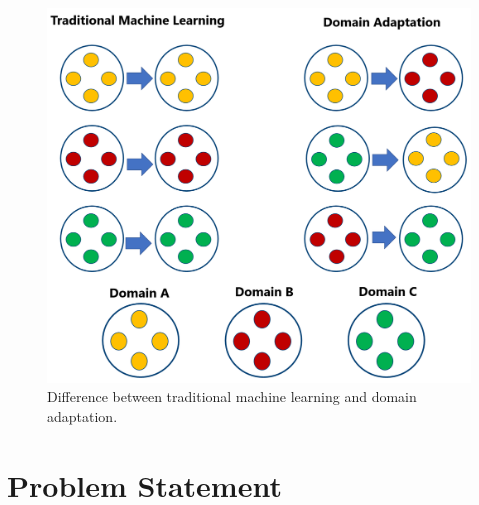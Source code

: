 \begin{figure}[H]
        \begin{center}
 	    \includegraphics[scale=0.30]{images/Introduction/DomainAdaptation.png}
	    \caption[Difference between traditional machine learning and domain adaptation.]{Difference between traditional machine learning and domain adaptation.}
	    \label{fig:DomainAdaptation}
	    \end{center}
\end{figure}



\section{Problem Statement}\label{ProblemStatement}

